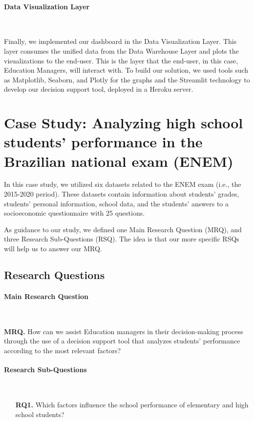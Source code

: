 \documentclass[12pt]{article}
\begin{document}
\paragraph{Data Visualization Layer}\

Finally, we implemented our dashboard in the Data Visualization Layer. This layer consumes the unified data from the Data Warehouse Layer and plots the visualizations to the end-user. This is the layer that the end-user, in this case, Education Managers, will interact with. To build our solution, we used tools such as Matplotlib, Seaborn, and Plotly for the graphs and the Streamlit technology to develop our decision support tool, deployed in a Heroku server.

\section{Case Study: Analyzing high school students' performance in the Brazilian national exam (ENEM)}

In this case study, we utilized six datasets related to the ENEM exam (i.e., the 2015-2020 period). These datasets contain information about students' grades, students' personal information, school data, and the students' answers to a socioeconomic questionnaire with 25 questions.

As guidance to our study, we defined one Main Research Question (MRQ), and three Research Sub-Questions (RSQ). The idea is that our more specific RSQs will help us to answer our MRQ.

\subsection{Research Questions}

\paragraph{Main Research Question}\

\textbf{MRQ.} How can we assist Education managers in their decision-making process through the use of a decision support tool that analyzes students' performance according to the most relevant factors?

\paragraph{Research Sub-Questions}\

\begin{itemize}
    \item[\textbf{RQ1.}] Which factors influence the school performance of elementary and high school
students?
\end{itemize}
\end{document}
